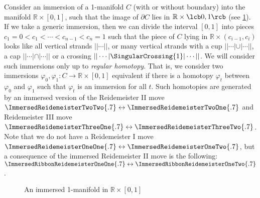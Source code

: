 Consider an immersion of a 1-manifold $C$ (with or without boundary) into the manifold $\mathbb R \times [0,1]$, such that the image of $\partial C$ lies in $\mathbb R \times \lcb 0,1 \rcb$ (see \cref{fig Immersed 1-manifold}). If we take a generic immersion, then we can divide the interval $[0,1]$ into pieces $c_1=0 < c_1 < \cdots < c_{n-1} < c_n = 1$ such that the piece of $C$ lying in $\mathbb R \times (c_{i-1},c_i)$ looks like all vertical strands $| | \cdots | |$, or many vertical strands with a cup $|| \cdots |\cup| \cdots ||$, a cap $|| \cdots |\cap| \cdots||$ or a crossing $|| \cdots |\SingularCrossing{1}| \cdots ||$. We will consider such immersions only up to \emph{regular homotopy}. That is, we consider two immersions $\varphi_0,\varphi_1 : C \rightarrow \mathbb R \times [0,1]$ equivalent if there is a homotopy $\varphi_t$ between $\varphi_0$ and $\varphi_1$ such that $\varphi_t$ is an immersion for all $t$. Such homotopies are generated by an immersed version of the Reidemeister II move $\ImmersedReidemeisterTwoTwo{.7} \leftrightarrow \ImmersedReidemeisterTwoOne{.7}$ and Reidemeister III move $\ImmersedReidemeisterThreeOne{.7} \leftrightarrow \ImmersedReidemeisterThreeTwo{.7}$. Note that we do not have a Reidemeister I move $\ImmersedReidemeisterOneOne{.7} \leftrightarrow \ImmersedReidemeisterOneTwo{.7}$, but a consequence of the immersed Reidemeister II move is the following: $\ImmersedRibbonReidemeisterOneOne{.7} \leftrightarrow \ImmersedRibbonReidemeisterOneTwo{.7}$.

\begin{figure}[tb]
\centering

\caption{An immersed 1-manifold in $\mathbb R \times [0,1]$}
\label{fig Immersed 1-manifold}
\end{figure}

